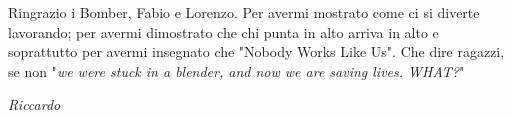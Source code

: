 Ringrazio i Bomber, Fabio e Lorenzo. Per avermi mostrato come ci si diverte lavorando; per avermi dimostrato che chi punta in alto arriva in alto e soprattutto per avermi insegnato che "Nobody Works Like Us". Che dire ragazzi, se non "\textit{we were stuck in a blender, and now we are saving lives. WHAT?}"

\begin{flushright}
\emph{Riccardo}
\end{flushright}

\cleardoublepage
\thispagestyle{empty}